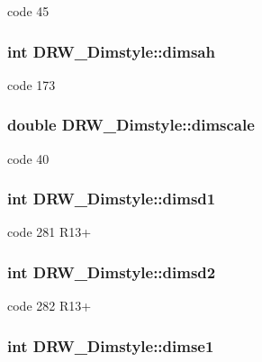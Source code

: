code 45 \hypertarget{classDRW__Dimstyle_aa0bbdb436f7fe738ee5566a2a447170d}{
\subsubsection[{dimsah}]{\setlength{\rightskip}{0pt plus 5cm}int D\-R\-W\-\_\-\-Dimstyle\-::dimsah}}\label{classDRW__Dimstyle_aa0bbdb436f7fe738ee5566a2a447170d}
code 173 \hypertarget{classDRW__Dimstyle_a2b9d92349258970f08efd3bd25d8cfd2}{
\subsubsection[{dimscale}]{\setlength{\rightskip}{0pt plus 5cm}double D\-R\-W\-\_\-\-Dimstyle\-::dimscale}}\label{classDRW__Dimstyle_a2b9d92349258970f08efd3bd25d8cfd2}
code 40 \hypertarget{classDRW__Dimstyle_a67e56dca697de6cb0514ba2e95a0907f}{
\subsubsection[{dimsd1}]{\setlength{\rightskip}{0pt plus 5cm}int D\-R\-W\-\_\-\-Dimstyle\-::dimsd1}}\label{classDRW__Dimstyle_a67e56dca697de6cb0514ba2e95a0907f}
code 281 R13+ \hypertarget{classDRW__Dimstyle_adee8bad44d6c486361c2809c0eeca8d6}{
\subsubsection[{dimsd2}]{\setlength{\rightskip}{0pt plus 5cm}int D\-R\-W\-\_\-\-Dimstyle\-::dimsd2}}\label{classDRW__Dimstyle_adee8bad44d6c486361c2809c0eeca8d6}
code 282 R13+ \hypertarget{classDRW__Dimstyle_ab22248ba9479af5636e522d9bbaf098d}{
\subsubsection[{dimse1}]{\setlength{\rightskip}{0pt plus 5cm}int D\-R\-W\-\_\-\-Dimstyle\-::dimse1}}\label{classDRW__Dimstyle_ab22248ba9479af5636e522d9bbaf098d}
